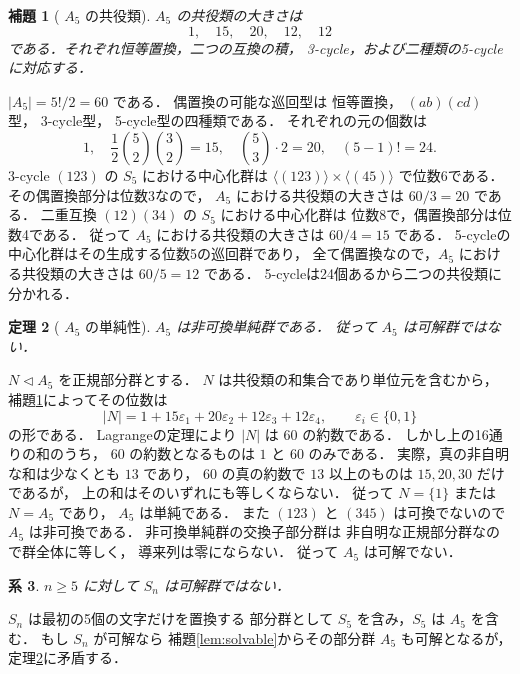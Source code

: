 \documentclass[a5paper,10pt,onecolumn]{jsarticle}
\makeatletter
\theoremstyle{mathnotetheorem}
\newtheorem{theorem}{定理}[section]
\newtheorem{lemma}[theorem]{補題}
\newtheorem{corollary}[theorem]{系}
\renewcommand{\proofname}{証明}
\renewenvironment{proof}[1][\proofname]{%
  \par\pushQED{\qed}\normalfont\topsep4\p@\@plus2\p@\relax
  \trivlist\item[\hskip\labelsep\bfseries #1]\ignorespaces
}{\popQED\endtrivlist\@endpefalse}
\makeatother
\begin{document}
\begin{lemma}[ $A_5$ の共役類]\label{lem:a5-classes}
$A_5$ の共役類の大きさは
\[
 1,\quad15,\quad20,\quad12,\quad12
\]
である．それぞれ恒等置換，二つの互換の積，
3-cycle，および二種類の5-cycleに対応する．
\end{lemma}
\begin{proof}
$|A_5|=5!/2=60$ である．
偶置換の可能な巡回型は
恒等置換，
$(ab)(cd)$ 型，
3-cycle型，
5-cycle型の四種類である．
それぞれの元の個数は
\[
 1,\quad\frac12\binom52\binom32=15,\quad
 \binom53\cdot2=20,\quad(5-1)!=24.
\]
3-cycle $(123)$ の $S_5$ における中心化群は
$\langle(123)\rangle\times\langle(45)\rangle$ で位数6である．
その偶置換部分は位数3なので，
$A_5$ における共役類の大きさは $60/3=20$ である．
二重互換 $(12)(34)$ の $S_5$ における中心化群は
位数8で，偶置換部分は位数4である．
従って $A_5$ における共役類の大きさは $60/4=15$ である．
5-cycleの中心化群はその生成する位数5の巡回群であり，
全て偶置換なので，$A_5$ における共役類の大きさは
$60/5=12$ である．
5-cycleは24個あるから二つの共役類に分かれる．
\end{proof}

\begin{theorem}[ $A_5$ の単純性]\label{thm:a5-simple}
$A_5$ は非可換単純群である．
従って $A_5$ は可解群ではない．
\end{theorem}
\begin{proof}
$N\triangleleft A_5$ を正規部分群とする．
$N$ は共役類の和集合であり単位元を含むから，
補題\ref{lem:a5-classes}によってその位数は
\[
 |N|=1+15\varepsilon_1+20\varepsilon_2
       +12\varepsilon_3+12\varepsilon_4,
 \qquad \varepsilon_i\in\{0,1\}
\]
の形である．
Lagrangeの定理により $|N|$ は $60$ の約数である．
しかし上の16通りの和のうち，
$60$ の約数となるものは $1$ と $60$ のみである．
実際，真の非自明な和は少なくとも $13$ であり，
$60$ の真の約数で $13$ 以上のものは
$15,20,30$ だけであるが，
上の和はそのいずれにも等しくならない．
従って $N=\{1\}$ または $N=A_5$ であり，
$A_5$ は単純である．
また $(123)$ と $(345)$ は可換でないので
$A_5$ は非可換である．
非可換単純群の交換子部分群は
非自明な正規部分群なので群全体に等しく，
導来列は零にならない．
従って $A_5$ は可解でない．
\end{proof}

\begin{corollary}\label{cor:sn-nonsolvable}
$n\ge5$ に対して $S_n$ は可解群ではない．
\end{corollary}
\begin{proof}
$S_n$ は最初の5個の文字だけを置換する
部分群として $S_5$ を含み，$S_5$ は $A_5$ を含む．
もし $S_n$ が可解なら
補題\ref{lem:solvable}からその部分群 $A_5$ も可解となるが，
定理\ref{thm:a5-simple}に矛盾する．
\end{proof}
\end{document}
